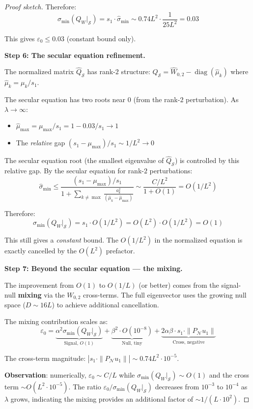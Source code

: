 \documentclass[11pt]{article}
\begin{document}
\begin{proof}[Proof sketch]
Therefore:
\[
\sigma_{\min}(Q_W|_\mathcal{S}) = s_1 \cdot \hat{\sigma}_{\min} \sim 0.74 L^2 \cdot \frac{1}{25 L^2} = 0.03
\]

This gives $\varepsilon_0 \leq 0.03$ (constant bound only).

\textbf{Step 6: The secular equation refinement.}

The normalized matrix $\hat{Q}_\mathcal{S}$ has rank-$2$ structure: $\hat{Q}_\mathcal{S} = \hat{W}_{0,2} - \operatorname{diag}(\hat{\mu}_k)$ where $\hat{\mu}_k = \mu_k / s_1$.

The secular equation has two roots near $0$ (from the rank-$2$ perturbation). As $\lambda \to \infty$:
\begin{itemize}
\item $\hat{\mu}_{\max} = \mu_{\max}/s_1 = 1 - 0.03/s_1 \to 1$
\item The \emph{relative} gap $(s_1 - \mu_{\max})/s_1 \sim 1/L^2 \to 0$
\end{itemize}

The secular equation root (the smallest eigenvalue of $\hat{Q}_\mathcal{S}$) is controlled by this relative gap. By the secular equation for rank-$2$ perturbations:
\[
\hat{\sigma}_{\min} \leq \frac{(s_1 - \mu_{\max})/s_1}{1 + \sum_{k \neq \max} \frac{a_k^2}{(\hat{\mu}_k - \hat{\mu}_{\max})}} \sim \frac{C/L^2}{1 + O(1)} = O(1/L^2)
\]

Therefore:
\[
\sigma_{\min}(Q_W|_\mathcal{S}) = s_1 \cdot O(1/L^2) = O(L^2) \cdot O(1/L^2) = O(1)
\]

This still gives a \emph{constant} bound. The $O(1/L^2)$ in the normalized equation is exactly cancelled by the $O(L^2)$ prefactor.

\textbf{Step 7: Beyond the secular equation --- the mixing.}

The improvement from $O(1)$ to $O(1/L)$ (or better) comes from the signal-null \textbf{mixing} via the $W_{0,2}$ cross-terms. The full eigenvector uses the growing null space ($D \sim 16L$) to achieve additional cancellation.

The mixing contribution scales as:
\[
\varepsilon_0 = \underbrace{\alpha^2 \sigma_{\min}(Q_W|_\mathcal{S})}_{\text{Signal, } O(1)} + \underbrace{\beta^2 \cdot O(10^{-8})}_{\text{Null, tiny}} + \underbrace{2\alpha\beta \cdot s_1 \cdot \|P_\mathcal{N} u_1\|}_{\text{Cross, negative}}
\]

The cross-term magnitude: $|s_1 \cdot \|P_\mathcal{N} u_1\|| \sim 0.74 L^2 \cdot 10^{-5}$.

\textbf{Observation}: numerically, $\varepsilon_0 \sim C/L$ while $\sigma_{\min}(Q_W|_\mathcal{S}) \sim O(1)$ and the cross term $\sim O(L^2 \cdot 10^{-5})$. The ratio $\varepsilon_0 / \sigma_{\min}(Q_W|_\mathcal{S})$ decreases from $10^{-3}$ to $10^{-4}$ as $\lambda$ grows, indicating the mixing provides an additional factor of $\sim 1/(L \cdot 10^2)$.


\end{proof}
\end{document}
